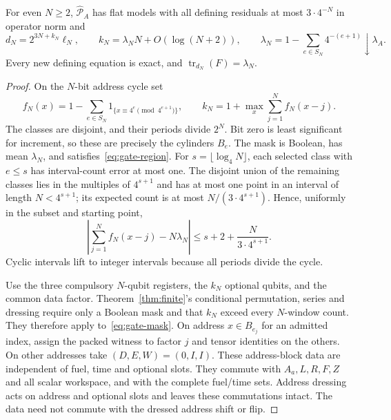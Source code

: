 \begin{lemma}\label{lem:gate-finite}
For even $N\ge2$, $\widehat{\mathcal P}_A$ has flat models with all defining residuals at most $3\cdot4^{-N}$ in operator norm and
\begin{equation}\label{eq:gate-dimension}
 d_N=2^{3N+k_N}\ell_N,\qquad
 k_N=\lambda_NN+O(\log(N+2)),\qquad
 \lambda_N=1-\sum_{e\in S_N}4^{-(e+1)}\downarrow\lambda_A.
\end{equation}
Every new defining equation is exact, and $\operatorname{tr}_{d_N}(F)=\lambda_N$.
\end{lemma}
\begin{proof}
On the $N$-bit address cycle set
\begin{equation}\label{eq:gate-mask}
 f_N(x)=1-\sum_{e\in S_N}1_{\{x\equiv4^e\!\!\pmod{4^{e+1}}\}},\qquad
 k_N=1+\max_x\sum_{j=1}^Nf_N(x-j).
\end{equation}
The classes are disjoint, and their periods divide $2^N$. Bit zero is least significant for increment, so these are precisely the cylinders $B_e$. The mask is Boolean, has mean $\lambda_N$, and satisfies~\eqref{eq:gate-region}. For $s=\lfloor\log_4N\rfloor$, each selected class with $e\le s$ has interval-count error at most one. The disjoint union of the remaining classes lies in the multiples of $4^{s+1}$ and has at most one point in an interval of length $N<4^{s+1}$; its expected count is at most $N/(3\cdot4^{s+1})$. Hence, uniformly in the subset and starting point,
\begin{equation}\label{eq:gate-window}
 \left|\sum_{j=1}^Nf_N(x-j)-N\lambda_N\right|
 \le s+2+\frac{N}{3\cdot4^{s+1}}.
\end{equation}
Cyclic intervals lift to integer intervals because all periods divide the cycle.

Use the three compulsory $N$-qubit registers, the $k_N$ optional qubits, and the common data factor. Theorem~\ref{thm:finite}'s conditional permutation, series and dressing require only a Boolean mask and that $k_N$ exceed every $N$-window count. They therefore apply to~\eqref{eq:gate-mask}. On address $x\in B_{e_j}$ for an admitted index, assign the packed witness to factor $j$ and tensor identities on the others. On other addresses take $(D,E,W)=(0,I,I)$. These address-block data are independent of fuel, time and optional slots. They commute with $A_a,L,R,F,Z$ and all scalar workspace, and with the complete fuel/time sets. Address dressing acts on address and optional slots and leaves these commutations intact. The data need not commute with the dressed address shift or flip.


\end{proof}
